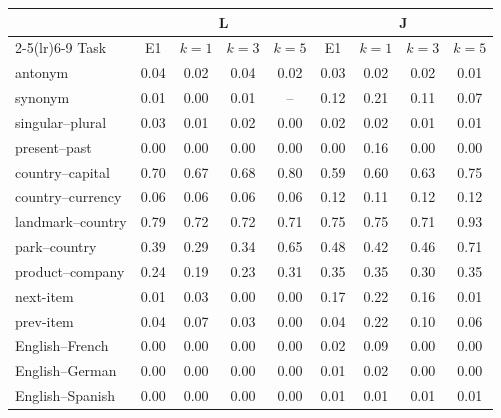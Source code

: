 \begin{tabular}{@{}lcccccccc@{}}
\toprule
 & \multicolumn{4}{c}{L} & \multicolumn{4}{c}{J} \\
\cmidrule(lr){2-5}\cmidrule(lr){6-9}
Task & E1 & $k=1$ & $k=3$ & $k=5$ & E1 & $k=1$ & $k=3$ & $k=5$ \\
\midrule
antonym & 0.04 & 0.02 & 0.04 & 0.02 & 0.03 & 0.02 & 0.02 & 0.01 \\
synonym & 0.01 & 0.00 & 0.01 & -- & 0.12 & 0.21 & 0.11 & 0.07 \\
singular--plural & 0.03 & 0.01 & 0.02 & 0.00 & 0.02 & 0.02 & 0.01 & 0.01 \\
present--past & 0.00 & 0.00 & 0.00 & 0.00 & 0.00 & 0.16 & 0.00 & 0.00 \\
country--capital & 0.70 & 0.67 & 0.68 & 0.80 & 0.59 & 0.60 & 0.63 & 0.75 \\
country--currency & 0.06 & 0.06 & 0.06 & 0.06 & 0.12 & 0.11 & 0.12 & 0.12 \\
landmark--country & 0.79 & 0.72 & 0.72 & 0.71 & 0.75 & 0.75 & 0.71 & 0.93 \\
park--country & 0.39 & 0.29 & 0.34 & 0.65 & 0.48 & 0.42 & 0.46 & 0.71 \\
product--company & 0.24 & 0.19 & 0.23 & 0.31 & 0.35 & 0.35 & 0.30 & 0.35 \\
next-item & 0.01 & 0.03 & 0.00 & 0.00 & 0.17 & 0.22 & 0.16 & 0.01 \\
prev-item & 0.04 & 0.07 & 0.03 & 0.00 & 0.04 & 0.22 & 0.10 & 0.06 \\
English--French & 0.00 & 0.00 & 0.00 & 0.00 & 0.02 & 0.09 & 0.00 & 0.00 \\
English--German & 0.00 & 0.00 & 0.00 & 0.00 & 0.01 & 0.02 & 0.00 & 0.00 \\
English--Spanish & 0.00 & 0.00 & 0.00 & 0.00 & 0.01 & 0.01 & 0.01 & 0.01 \\
\bottomrule
\end{tabular}

